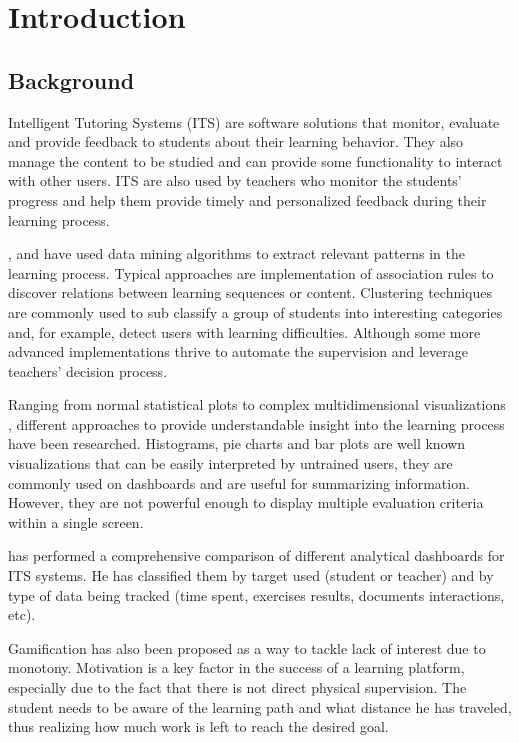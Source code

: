 \chapter{Introduction}\label{ch:introduction}

\section{Background}

Intelligent Tutoring Systems (ITS) are software solutions that monitor, evaluate and provide feedback to students about their learning behavior. They also manage the content to be studied and can provide some functionality to interact with other users. ITS are also used by teachers who monitor the students’ progress and help them provide timely and personalized feedback during their learning process.

\cite{Jugo2014}, \cite{Romero2008} and \cite{Dogan2009} have used data mining algorithms to extract relevant patterns in the learning process. Typical approaches are implementation of association rules to discover relations between learning sequences or content. Clustering techniques are commonly used to sub classify a group of students into interesting categories and, for example, detect users with learning difficulties. Although some more advanced implementations thrive to automate the supervision and leverage teachers' decision process.

Ranging from normal statistical plots \cite{Romero2008} to complex multidimensional visualizations \cite{Dogan2009}, different approaches to provide understandable insight into the learning process have been researched. Histograms, pie charts and bar plots are well known visualizations that can be easily interpreted by untrained users, they are commonly used on dashboards and are useful for summarizing information. However, they are not powerful enough to display multiple evaluation criteria within a single screen.

\citeauthor{Verbert2013}\cite{Verbert2013} has performed a comprehensive comparison of different analytical dashboards for ITS systems. He has classified them by target used (\Ie student or teacher) and by type of data being tracked (\Eg time spent, exercises results, documents interactions, etc). 

Gamification \cite{Gonzalez2014} has also been proposed as a way to tackle lack of interest due to monotony. Motivation is a key factor in the success of a learning platform, especially due to the fact that there is not direct physical supervision. The student needs to be aware of the learning path and what distance he has traveled, thus realizing how much work is left to reach the desired goal.

